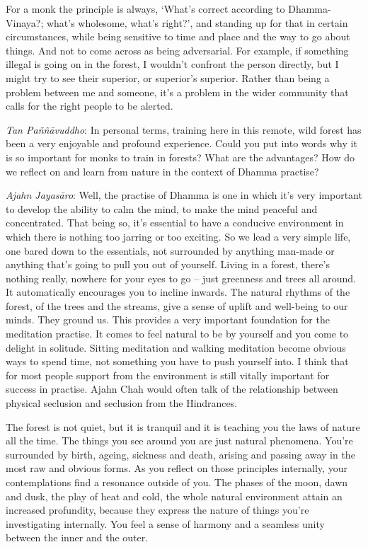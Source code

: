 For a monk the principle is always, `What's correct according to
Dhamma-Vinaya?; what's wholesome, what's right?', and standing up for
that in certain circumstances, while being sensitive to time and place
and the way to go about things. And not to come across as being
adversarial. For example, if something illegal is going on in the
forest, I wouldn't confront the person directly, but I might try to see
their superior, or superior's superior. Rather than being a problem
between me and someone, it's a problem in the wider community that calls
for the right people to be alerted. 

\emph{Tan Paññāvuddho}: In personal terms, training here in this
remote, wild forest has been a very enjoyable and profound experience. 
Could you put into words why it is so important for monks to train in
forests? What are the advantages? How do we reflect on and learn from
nature in the context of Dhamma practise? 

\emph{Ajahn Jayasāro}: Well, the practise of Dhamma is one in which
it's very important to develop the ability to calm the mind, to make the
mind peaceful and concentrated. That being so, it's essential to have a
conducive environment in which there is nothing too jarring or too
exciting. So we lead a very simple life, one bared down to the
essentials, not surrounded by anything man-made or anything that's going
to pull you out of yourself. Living in a forest, there's nothing really, 
nowhere for your eyes to go -- just greenness and trees all around. It
automatically encourages you to incline inwards. The natural rhythms of
the forest, of the trees and the streams, give a sense of uplift and
well-being to our minds. They ground us. This provides a very important
foundation for the meditation practise. It comes to feel natural to be
by yourself and you come to delight in solitude. Sitting meditation and
walking meditation become obvious ways to spend time, not something you
have to push yourself into. I think that for most people support from
the environment is still vitally important for success in practise. 
Ajahn Chah would often talk of the relationship between physical
seclusion and seclusion from the Hindrances. 

The forest is not quiet, but it is tranquil and it is teaching you the
laws of nature all the time. The things you see around you are just
natural phenomena. You're surrounded by birth, ageing, sickness and
death, arising and passing away in the most raw and obvious forms. As
you reflect on those principles internally, your contemplations find a
resonance outside of you. The phases of the moon, dawn and dusk, the
play of heat and cold, the whole natural environment attain an increased
profundity, because they express the nature of things you're
investigating internally. You feel a sense of harmony and a seamless
unity between the inner and the outer. 

